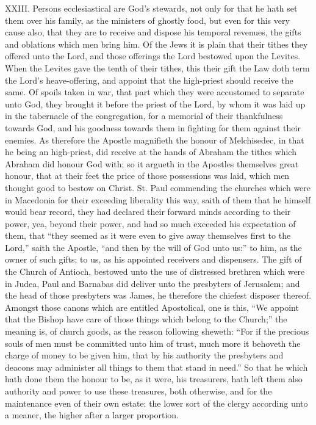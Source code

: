 XXIII. Persons ecclesiastical are God’s stewards, not only for that he hath set them over his family, as the ministers of ghostly food, but even for this very cause also, that they are to receive and dispose his temporal revenues, the gifts and oblations which men bring him. Of the Jews it is plain that their tithes they offered unto the Lord, and those offerings the Lord bestowed upon the Levites. When the Levites gave the tenth of their tithes, this their gift the Law doth term the Lord’s heave-offering, and appoint that the high-priest should receive the same. Of spoils taken in war, that part which they were accustomed to separate unto God, they brought it before the priest of the Lord, by whom it was laid up in the tabernacle of the congregation, for a memorial of their thankfulness towards God, and his goodness towards them in fighting for them against their enemies. As therefore the Apostle magnifieth the honour of Melchisedec, in that he being an high-priest, did receive at the hands of Abraham the tithes which Abraham did honour God with; so it argueth in the Apostles themselves great honour, that at their feet  the price of those possessions was laid, which men thought good to bestow on Christ. St. Paul commending the churches which were in Macedonia for their exceeding liberality this way, saith of them that he himself would bear record, they had declared their forward minds according to their power, yea, beyond their power, and had so much exceeded his expectation of them, that “they seemed as it were even to give away themselves first to the Lord,” saith the Apostle, “and then by the will of God unto us:” to him, as the owner of such gifts; to us, as his appointed receivers and dispensers. The gift of the Church of Antioch, bestowed unto the use of distressed brethren which were in Judea, Paul and Barnabas did deliver unto the presbyters of Jerusalem; and the head of those presbyters was James, he therefore the chiefest disposer thereof. Amongst those canons which are entitled Apostolical, one is this, “We appoint that the Bishop have care of those things which belong to the Church;” the meaning is, of church goods, as the reason following sheweth: “For if the precious souls of men must be committed unto him of trust, much more it behoveth the charge of money to be given him, that by his authority the presbyters and deacons may administer all things to them that stand in need.” So that he which hath done them the honour to be, as it were, his treasurers, hath left them also authority and power to use these treasures, both otherwise, and for the maintenance even of their own estate: the lower sort of the clergy according unto a meaner, the higher after a larger proportion.


